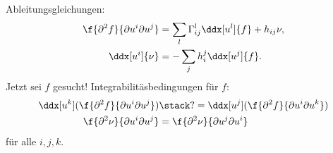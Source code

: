 Ableitungsgleichungen:
\begin{align*}
	\f{\partial^2 f}{\partial u^i \partial u^j} &= \sum_{l} \Gamma_{ij}^l \ddx[u^l]{f} + h_{ij} \nu, \\
	\ddx[u^i]{\nu} &= - \sum_{j} h_i^j \ddx[u^j]{f}.
\end{align*}
Jetzt sei $f$ gesucht!
Integrabilitäsbedingungen für $f$:
\begin{align*}
	\ddx[u^k] (\f{\partial^2 f}{\partial u^i \partial u^j})
	&\stack ?=
	\ddx[u^j] (\f{\partial^2 f}{\partial u^i \partial u^k}) \\
	\f{\partial^2 \nu}{\partial u^i \partial u^j} &= \f{\partial^2 \nu}{\partial u^j \partial u^i}
\end{align*}
für alle $i, j, k$.


